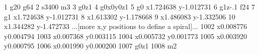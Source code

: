   1 g20 g64
   2 s3400 m3
   3 g0z1
   4 g0x0y0z1
   5 g0 x1.724638 y-1.012731
   6 g1z-.1 f24
   7 g1 x1.724638 y-1.012731
   8 x1.613302 y-1.178668
   9 x1.486083 y-1.332506
  10 x1.344282 y-1.472733
 ...[more x,y positions to define a spiral]...
1002 x0.008776 y0.004794
1003 x0.007368 y0.003115
1004 x0.005732 y0.001773
1005 x0.003920 y0.000795
1006 x0.001990 y0.000200
1007 g0z1
1008 m2
